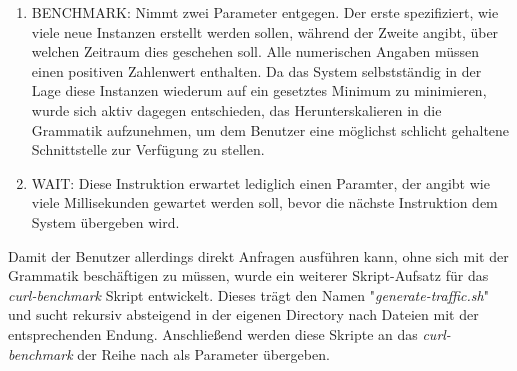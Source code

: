 \begin{enumerate}
  \item BENCHMARK: Nimmt zwei Parameter entgegen. Der erste spezifiziert, wie viele neue Instanzen erstellt werden sollen, während der Zweite angibt, über welchen Zeitraum dies geschehen soll. Alle numerischen Angaben müssen einen positiven Zahlenwert enthalten. Da das System selbstständig in der Lage diese Instanzen wiederum auf ein gesetztes Minimum zu minimieren, wurde sich aktiv dagegen entschieden, das Herunterskalieren in die Grammatik aufzunehmen, um dem Benutzer eine möglichst schlicht gehaltene Schnittstelle zur Verfügung zu stellen.
  \item WAIT: Diese Instruktion erwartet lediglich einen Paramter, der angibt wie viele Millisekunden gewartet werden soll, bevor die nächste Instruktion dem System übergeben wird. 
\end{enumerate}


Damit der Benutzer allerdings direkt Anfragen ausführen kann, ohne sich mit der Grammatik beschäftigen zu müssen, wurde ein weiterer Skript-Aufsatz 
für das \emph{curl-benchmark} Skript entwickelt. Dieses trägt den Namen "\emph{generate-traffic.sh}" und sucht rekursiv absteigend in der eigenen Directory nach Dateien mit der entsprechenden Endung. Anschließend werden diese Skripte an das \emph{curl-benchmark} der Reihe nach als Parameter übergeben.



